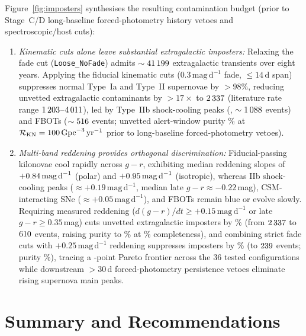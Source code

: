 \documentclass[twocolumn]{aastex631}
\newcommand{\gpcyr}{\mathrm{Gpc}^{-3}\,\mathrm{yr}^{-1}}
\begin{document}
Figure~\ref{fig:imposters} synthesises the resulting contamination budget (prior to Stage~C/D long-baseline forced-photometry history vetoes and spectroscopic/host cuts):
\begin{enumerate}
    \item \emph{Kinematic cuts alone leave substantial extragalactic imposters:} Relaxing the fade cut (\texttt{Loose\_NoFade}) admits $\sim 41\,199{}$ extragalactic transients over eight years. Applying the fiducial kinematic cuts ($0.3\,\mathrm{mag\,d}^{-1}$ fade, $\le 14$\,d span) suppresses normal Type~Ia and Type~II supernovae by $>98\%$, reducing unvetted extragalactic contaminants by $>17\times$ to $2\,337{}$ (literature rate range $1\,203{}$--$4\,011{}$), led by Type~IIb shock-cooling peaks (\texttt{\ImpDominantFid{}}, $\sim 1\,088{}$ events) and FBOTs ($\sim 516{}$ events; unvetted alert-window purity \PurityFidNoColorPct{}\% at $\mathcal{R}_{\rm KN} = 100\,\gpcyr$ prior to long-baseline forced-photometry vetoes).
    \item \emph{Multi-band reddening provides orthogonal discrimination:} Fiducial-passing kilonovae cool rapidly across $g-r$, exhibiting median reddening slopes of $+0.84{}\,\mathrm{mag\,d}^{-1}$ (polar) and $+0.95{}\,\mathrm{mag\,d}^{-1}$ (isotropic), whereas IIb shock-cooling peaks ($\approx +0.19\,\mathrm{mag\,d}^{-1}$, median late $g-r \approx -0.22$\,mag), CSM-interacting SNe ($\approx +0.05\,\mathrm{mag\,d}^{-1}$), and FBOTs remain blue or evolve slowly. Requiring measured reddening ($d(g-r)/dt \ge +0.15\,\mathrm{mag\,d}^{-1}$ or late $g-r \ge 0.35$\,mag) cuts unvetted extragalactic imposters by \ImpRedGateReductionPct{}\% (from $2\,337{}$ to $610{}$ events, raising purity to \PurityFidRedGatePct{}\% at \CompFidRedGatePct{}\% completeness), and combining strict fade cuts with $+0.25\,\mathrm{mag\,d}^{-1}$ reddening suppresses imposters by \ImpStrictRedReductionPct{}\% (to $239{}$ events; purity \PurityStrictRedPct{}\%), tracing a \ParetoPointCount{}-point Pareto frontier across the 36 tested configurations while downstream $>30$\,d forced-photometry persistence vetoes eliminate rising supernova main peaks.
\end{enumerate}

\section{Summary and Recommendations}
\label{sec:summary}
\end{document}
